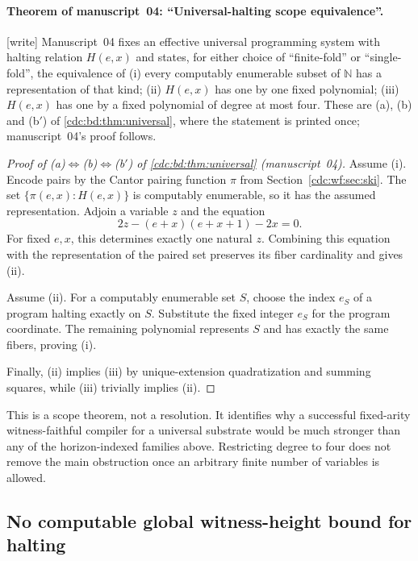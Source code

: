\documentclass[11pt,a4paper]{article}
\theoremstyle{definition}
\theoremstyle{remark}
\newcommand{\N}{\mathbb N}
\newcommand{\wtag}{\textup{[write]}}%
\begin{document}
\paragraph{Theorem of manuscript~04: ``Universal-halting scope equivalence''.} \wtag{} Manuscript~04 fixes an effective universal programming system with halting relation $H(e,x)$ and states, for either choice of ``finite-fold'' or ``single-fold'', the equivalence of (i) every computably enumerable subset of $\N$ has a representation of that kind; (ii) $H(e,x)$ has one by one fixed polynomial; (iii) $H(e,x)$ has one by a fixed polynomial of degree at most four. These are (a), (b) and (b$'$) of \cref{cdc:bd:thm:universal}, where the statement is printed once; manuscript~04's proof follows.

\begin{proof}[Proof of (a)$\Leftrightarrow$(b)$\Leftrightarrow$(b$'$) of \cref{cdc:bd:thm:universal} (manuscript~04)]
Assume (i). Encode pairs by the Cantor pairing function $\pi$ from Section~\ref{cdc:wf:sec:ski}. The set $\{\pi(e,x):H(e,x)\}$ is computably enumerable, so it has the assumed representation. Adjoin a variable $z$ and the equation
\[
 2z-(e+x)(e+x+1)-2x=0.
\]
For fixed $e,x$, this determines exactly one natural $z$. Combining this equation with the representation of the paired set preserves its fiber cardinality and gives (ii).

Assume (ii). For a computably enumerable set $S$, choose the index $e_S$ of a program halting exactly on $S$. Substitute the fixed integer $e_S$ for the program coordinate. The remaining polynomial represents $S$ and has exactly the same fibers, proving (i).

Finally, (ii) implies (iii) by unique-extension quadratization and summing squares, while (iii) trivially implies (ii).
\end{proof}

This is a scope theorem, not a resolution. It identifies why a successful fixed-arity witness-faithful compiler for a universal substrate would be much stronger than any of the horizon-indexed families above. Restricting degree to four does not remove the main obstruction once an arbitrary finite number of variables is allowed.

\subsection{No computable global witness-height bound for halting}
\end{document}
